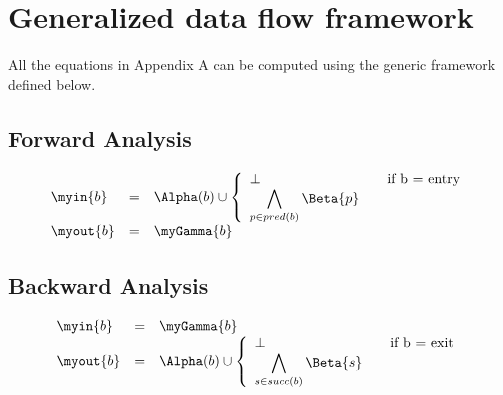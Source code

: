 \chapter{Generalized data flow framework}

All the equations in Appendix A can be computed using the generic
framework defined below.

\section{Forward Analysis}
\begin{equation}
\begin{array}{l c l}
\myin{b} &=& \Alpha(b) \cup  \left\{
                    \begin{array}{l l}
                        \bot & \quad \text{if b = entry}\\
                        \displaystyle \bigwedge_{p \in pred(b)} \Beta{p}&
                    \end{array} \right. \\
\myout{b} &=& \myGamma{b}                      
\end{array}
\end{equation}

\section{Backward Analysis}
\begin{equation}
\begin{array}{l c l}
\myin{b} &=& \myGamma{b}                      \\
\myout{b} &=& \Alpha(b) \cup  \left\{
                    \begin{array}{l l}
                        \bot & \quad \text{if b = exit}\\
                        \displaystyle \bigwedge_{s \in succ(b)} \Beta{s}&
                    \end{array} \right. \\
\end{array}
\end{equation}

